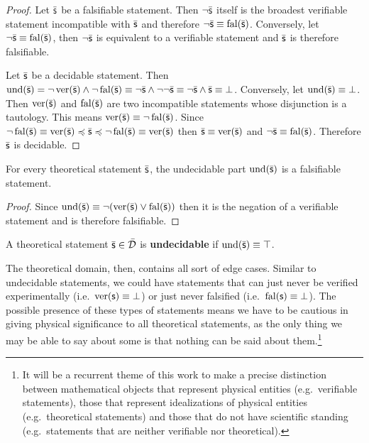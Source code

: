 \documentclass[11pt,letterpaper,fleqn]{memoir} %
\begin{document}
\begin{mathSection}
\begin{proof}
	Let $\bar{\mathsf{s}}$ be a falsifiable statement. Then $\neg\bar{\mathsf{s}}$ itself is the broadest verifiable statement incompatible with $\bar{\mathsf{s}}$ and therefore $\neg\bar{\mathsf{s}} \equiv \operatorname{fal}(\bar{\mathsf{s}})$. Conversely, let $\neg\bar{\mathsf{s}} \equiv \operatorname{fal}(\bar{\mathsf{s}})$, then $\neg\bar{\mathsf{s}}$ is equivalent to a verifiable statement and $\bar{\mathsf{s}}$ is therefore falsifiable.
	
	Let $\bar{\mathsf{s}}$ be a decidable statement. Then $\operatorname{und}(\bar{\mathsf{s}}) = \neg \operatorname{ver}(\bar{\mathsf{s}}) \wedge \neg \operatorname{fal}(\bar{\mathsf{s}}) \equiv \neg \bar{\mathsf{s}} \wedge \neg \neg \bar{\mathsf{s}} \equiv \neg \bar{\mathsf{s}} \wedge \bar{\mathsf{s}} \equiv \bot$. Conversely, let $\operatorname{und}(\bar{\mathsf{s}}) \equiv \bot$. Then $\operatorname{ver}(\bar{\mathsf{s}})$ and $\operatorname{fal}(\bar{\mathsf{s}})$ are two incompatible statements whose disjunction is a tautology. This means $\operatorname{ver}(\bar{\mathsf{s}}) \equiv \neg \operatorname{fal}(\bar{\mathsf{s}})$. Since $\neg \operatorname{fal}(\bar{\mathsf{s}}) \equiv \operatorname{ver}(\bar{\mathsf{s}}) \preccurlyeq \bar{\mathsf{s}} \preccurlyeq \neg \operatorname{fal}(\bar{\mathsf{s}}) \equiv \operatorname{ver}(\bar{\mathsf{s}})$ then $\bar{\mathsf{s}} \equiv \operatorname{ver}(\bar{\mathsf{s}})$ and $\neg\bar{\mathsf{s}} \equiv \operatorname{fal}(\bar{\mathsf{s}})$. Therefore $\bar{\mathsf{s}}$ is decidable.	
\end{proof}

\begin{coro}
	For every theoretical statement $\bar{\mathsf{s}}$, the undecidable part $\operatorname{und}(\bar{\mathsf{s}})$ is a falsifiable statement.
\end{coro}

\begin{proof}
	Since $\operatorname{und}(\bar{\mathsf{s}}) \equiv \neg (\operatorname{ver}(\bar{\mathsf{s}}) \vee \operatorname{fal}(\bar{\mathsf{s}}))$ then it is the negation of a verifiable statement and is therefore falsifiable.
\end{proof}

\begin{defn}
	A theoretical statement $\bar{\mathsf{s}} \in \bar{\mathcal{D}}$ is \textbf{undecidable} if $\operatorname{und}(\bar{\mathsf{s}}) \equiv \top$.
\end{defn}
\end{mathSection}

The theoretical domain, then, contains all sort of edge cases. Similar to undecidable statements, we could have statements that can just never be verified experimentally (i.e.~$\operatorname{ver}(\mathsf{s}) \equiv \bot$) or just never falsified (i.e.~$\operatorname{fal}(\mathsf{s}) \equiv \bot$). The possible presence of these types of statements means we have to be cautious in giving physical significance to all theoretical statements, as the only thing we may be able to say about some is that nothing can be said about them.\footnote{It will be a recurrent theme of this work to make a precise distinction between mathematical objects that represent physical entities (e.g.~verifiable statements), those that represent idealizations of physical entities (e.g.~theoretical statements) and those that do not have scientific standing (e.g.~statements that are neither verifiable nor theoretical).}
\end{document}
